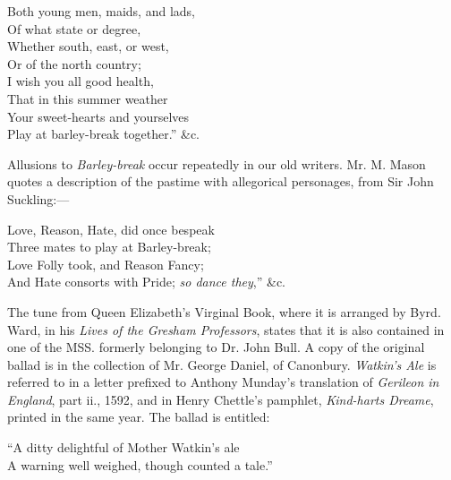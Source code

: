 \begin{scverse}
\begin{altverse}
Both young men, maids, and lads,\\
Of what state or degree,\\
Whether south, east, or west,\\
Or of the north country;\\
I wish you all good health,\\
That in this summer weather\\
Your sweet-hearts and yourselves\\
Play at barley-break together.” \&c.
\end{altverse}
\end{scverse}

Allusions to \textit{Barley-break} occur repeatedly in our old writers. Mr. M. Mason
quotes a description of the pastime with allegorical personages, from Sir John
Suckling:—
\begin{scverse}
Love, Reason, Hate, did once bespeak\\
Three mates to play at Barley-break;\\
Love Folly took, and Reason Fancy;\\
And Hate consorts with Pride; \textit{so dance they},” \&c.
\end{scverse}


The tune from Queen Elizabeth’s Virginal Book, where it is arranged by Byrd.
Ward, in his \textit{Lives of the Gresham Professors}, states that it is also contained in
one of the MSS. formerly belonging to Dr. John Bull. A copy of the original
ballad is in the collection of Mr. George Daniel, of Canonbury. \textit{Watkin’s Ale} is
referred to in a letter prefixed to \pagebreak Anthony Munday’s translation of \textit{Gerileon in
\normalsize
England}, part ii., 1592, and in Henry Chettle’s pamphlet, \textit{Kind-harts Dreame},
printed in the same year. The ballad is entitled:

\begin{scverse}“A ditty delightful of Mother Watkin’s ale\\
A warning well weighed, though counted a tale.”
\end{scverse}



